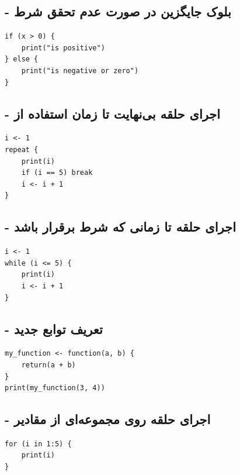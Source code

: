 \documentclass[11pt, a4paper, oneside]{book}
\begin{document}
			\subsection{ - بلوک جایگزین در صورت عدم تحقق شرط}
				\begin{latin}
					\begin{lstlisting}[caption={\lr{else}}]
if (x > 0) {
	print("is positive")
} else {
	print("is negative or zero")
}
					\end{lstlisting}
				\end{latin}
				
			\subsection{ - اجرای حلقه بی‌نهایت تا زمان استفاده از }
				\begin{latin}
					\begin{lstlisting}[caption={\lr{repeat}}]
i <- 1
repeat {
	print(i)
	if (i == 5) break
	i <- i + 1
}
					\end{lstlisting}
				\end{latin}
				
				
			\subsection{ - اجرای حلقه تا زمانی که شرط برقرار باشد}
				\begin{latin}
					\begin{lstlisting}[caption={\lr{while}}]
i <- 1
while (i <= 5) {
	print(i)
	i <- i + 1
}
					\end{lstlisting}
				\end{latin}
				
			\subsection{ - تعریف توابع جدید}
				\begin{latin}
					\begin{lstlisting}[caption={\lr{function}}]
my_function <- function(a, b) {
	return(a + b)
}
print(my_function(3, 4))
					\end{lstlisting}
				\end{latin}
				
				
			\subsection{ - اجرای حلقه روی مجموعه‌ای از مقادیر}
				\begin{latin}
					\begin{lstlisting}[caption={\lr{for}}]
for (i in 1:5) {
	print(i)
}
					\end{lstlisting}
				\end{latin}
				
\end{document}
